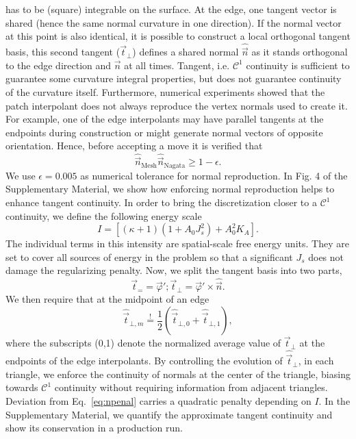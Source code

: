 \documentclass[twocolumn]{biophys-new}
\begin{document}
has to be (square) integrable on the surface. At the edge, one  tangent vector is shared (hence the same normal curvature in one direction\cite{do2016differential}). If the normal vector at this point is also identical, it is possible to construct a local orthogonal tangent basis, this second tangent ($  \vec{t}_\bot$) defines a shared normal $\hat{\vec{n}}$ as it stands orthogonal to the edge direction and $\vec{n}$ at all times.
Tangent, i.e. $\mathcal{C}^1$ continuity is sufficient to guarantee some curvature integral properties, but does not guarantee continuity of the curvature itself.
Furthermore, numerical experiments showed that the patch interpolant does not always reproduce the vertex normals used to create it. For example, one of the edge interpolants may have parallel tangents at the endpoints during construction or might generate normal vectors of opposite orientation. Hence, before accepting a move it is verified that
\begin{equation}
 \hat{\vec{n}}_\mathrm{Mesh} \hat{\vec{n}}_\mathrm{Nagata} \geq 1-\epsilon.
\end{equation}
We use $\epsilon = 0.005$ as numerical tolerance for normal reproduction. In Fig. 4 of the Supplementary Material,  we show how enforcing normal reproduction helps to enhance tangent continuity. 
In order to bring the discretization closer to a $\mathcal{C}^1$ continuity, we define the following energy scale
\begin{equation}
 I = [(\kappa+1)(1+A_0J_s^2)+A_0^2K_A].
\end{equation}
The individual terms in this intensity are spatial-scale free energy units. They are set to cover all sources of energy in the problem so that a significant $J_s$ does not damage the regularizing penalty. 
Now, we split the tangent basis into two parts,
\begin{equation}
 \vec{t}_{=} = \vec{\varphi}' ; \vec{t}_\bot = \vec{\varphi}' \times \hat{\vec{n}}.  
\end{equation}
We then require that at the midpoint of an edge
\begin{equation}
 \hat{\vec{t}}_{\bot,m} \stackrel{!}{=} \frac{1}{2} (\hat{\vec{t}}_{\bot,0} + \hat{\vec{t}}_{\bot,1}),
 \label{eq:npenal}
\end{equation}
where the subscripts (0,1) denote the normalized average value of $\vec{t}_\bot$ at the endpoints of the edge interpolants. By controlling the evolution of $\hat{\vec{t}}_{\bot}$, in each triangle,
we enforce the continuity of normals at the center of the triangle, biasing towards $\mathcal{C}^1$ continuity without requiring information from adjacent triangles. Deviation from Eq.~\ref{eq:npenal} carries a quadratic penalty depending on $I$. In the Supplementary Material, we quantify the approximate tangent continuity and show its conservation in a production run.
\end{document}
